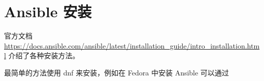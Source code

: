 \section{Ansible 安装}
官方文档 \url{https://docs.ansible.com/ansible/latest/installation_guide/intro_installation.html} 介绍了各种安装方法。

最简单的方法使用 dnf 来安装，例如在 Fedora 中安装 Ansible 可以通过


